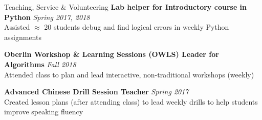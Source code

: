 \documentclass{resume}
\begin{document}
\begin{rSection}{Teaching, Service \& Volunteering}
{\bf Lab helper for Introductory course in Python} \hfill {\em Spring 2017, 2018} \\
{ Assisted $\approx$ 20 students debug and find logical errors in weekly Python assignments}

{\bf Oberlin Workshop \& Learning Sessions (OWLS) Leader for Algorithms} \hfill {\em Fall 2018} \\
{ Attended class to plan and lead interactive, non-traditional workshops (weekly)} 


{\bf Advanced Chinese Drill Session Teacher} \hfill {\em Spring 2017} \\
{ Created lesson plans (after attending class) to lead weekly drills to help students improve speaking fluency}









\end{rSection}
\end{document}

